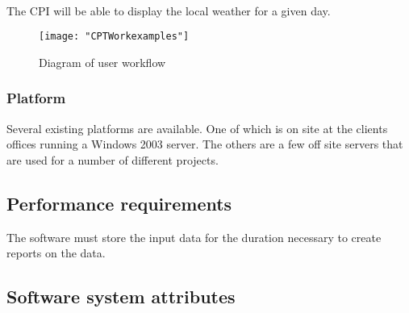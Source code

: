 \documentclass[12pt]{article}
\begin{document}
\paragraph{} The CPI will be able to display the local weather for a given day.

\begin{figure}[H]
\begin{center}
\texttt{[image: "CPTWorkexamples"]}
\caption{Diagram of user workflow}
\label{fig:dia}
\end{center}
\end{figure}



\subsubsection{Platform}\label{sec:Platform}
Several existing platforms are available. One of which is on site at the clients offices running a Windows 2003 server. The others are a few off site servers that are used for a number of different projects.

\subsection{Performance requirements}
The software must store the input data for the duration necessary to create reports on the data.

\subsection{Software system attributes}
\end{document}

